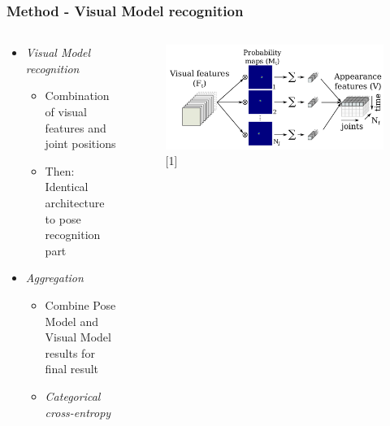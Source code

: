 \documentclass[9pt]{beamer}
\providecommand{\sourcefix}[1]{\\ \footnotesize \tugreen{Source:} [#1]}
\newenvironment{myframe}[1][]{%
\begin{frame}%
\frametitle{#1}
\setcounter{footnote}{0}


}{%
\end{frame}%
}
\begin{document}
\begin{myframe}[Method - Visual Model recognition]
    	\begin{columns}[T]
        \begin{column}{.45\textwidth}
            \begin{itemize}
                \item \textit{Visual Model recognition}
                \begin{itemize}
                    \item Combination of visual features and joint positions
                    \item Then: Identical architecture to pose recognition part
                \end{itemize}
                \item \textit{Aggregation}
                \begin{itemize}
                    \item Combine Pose Model and Visual Model results for final result
                    \item \textit{Categorical cross-entropy}
                \end{itemize}
            \end{itemize}
        \end{column}
        \begin{column}{.45\textwidth}
            \begin{figure}
                \includegraphics[width=.99\textwidth]{appearance-features.png}
                \sourcefix{1}
            \end{figure}
        \end{column}
	\end{columns}
\end{myframe}
\end{document}
